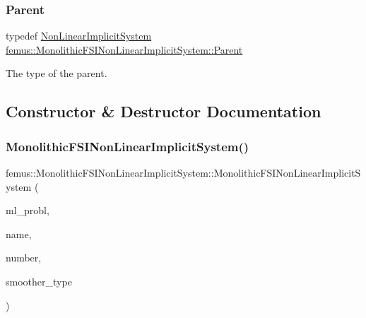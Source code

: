 \subsubsection{\texorpdfstring{Parent}{Parent}}
{\footnotesize\ttfamily typedef \mbox{\hyperlink{classfemus_1_1_non_linear_implicit_system}{Non\+Linear\+Implicit\+System}} \mbox{\hyperlink{classfemus_1_1_monolithic_f_s_i_non_linear_implicit_system_ac9effcc16eb9a19fa306a9e5f078569b}{femus\+::\+Monolithic\+F\+S\+I\+Non\+Linear\+Implicit\+System\+::\+Parent}}}

The type of the parent. 

\subsection{Constructor \& Destructor Documentation}
\mbox{\label{classfemus_1_1_monolithic_f_s_i_non_linear_implicit_system_a9b54865456324fbbf6dcad52f270f305}} 
\subsubsection{\texorpdfstring{Monolithic\+F\+S\+I\+Non\+Linear\+Implicit\+System()}{MonolithicFSINonLinearImplicitSystem()}}
{\footnotesize\ttfamily femus\+::\+Monolithic\+F\+S\+I\+Non\+Linear\+Implicit\+System\+::\+Monolithic\+F\+S\+I\+Non\+Linear\+Implicit\+System (\begin{DoxyParamCaption}\item[{\mbox{\hyperlink{classfemus_1_1_multi_level_problem}{Multi\+Level\+Problem}} \&}]{ml\+\_\+probl,  }\item[{const std\+::string \&}]{name,  }\item[{const unsigned int}]{number,  }\item[{const \mbox{\hyperlink{_mg_smoother_enum_8hpp_a4d11c2ff93e2f0f440c879a9c40cda71}{Mg\+Smoother}} \&}]{smoother\+\_\+type }\end{DoxyParamCaption})}

